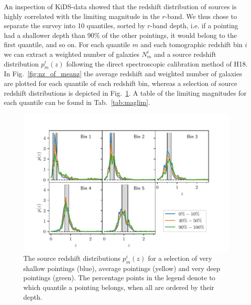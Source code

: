 \documentclass{aa}
\begin{document}
An inspection of KiDS-data showed that the redshift distribution of sources is highly correlated with the limiting magnitude in the $r$-band. We thus chose to separate the survey into 10 quantiles, sorted by $r$-band depth, i.e. if a pointing had a shallower depth than 90\% of the other pointings, it would belong to the first quantile, and so on. For each quantile $m$ and each tomographic redshift bin $i$ we can extract a weighted number of galaxies $N^i_m$ and a source redshift distribution $p^i_m(z)$ following the direct spectroscopic calibration method of H18. In Fig.~\ref{fig:nz_of_meanz} the average redshift and weighted number of galaxies are plotted for each quantile of each redshift bin, whereas a selection of source redshift distributions is depicted in Fig.~\ref{fig:nofz_quantiles}. A table of the limiting magnitudes for each quantile can be found in Tab.~\ref{tab:maglim}.
%
\begin{figure}
\centering
\includegraphics[trim = {1cm 0 1.2cm 0.1cm}, clip, width=\linewidth]{images/dist_z_all.pdf}
\caption{The source redshift distributions $p^i_m(z)$ for a selection of very shallow pointings (blue), average pointings (yellow) and very deep pointings (green). The percentage points in the legend denote to which quantile a pointing belongs, when all are ordered by their depth.}
\label{fig:nofz_quantiles}
\end{figure}
\end{document}
